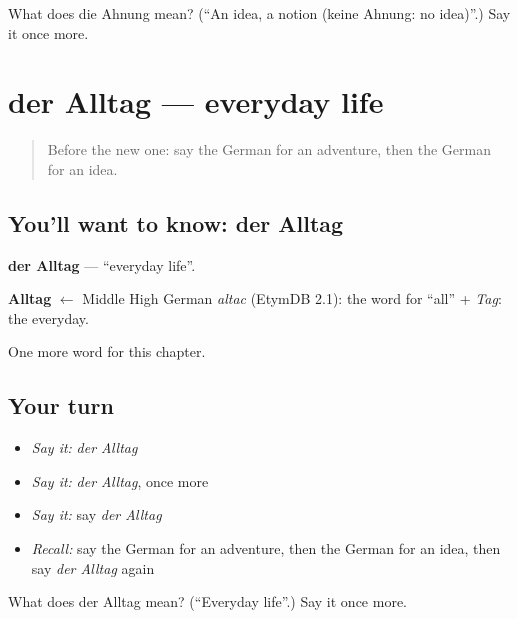 \begin{tcolorbox}[breakable,colback=teal!4,colframe=teal!35!black,title={Before you move on}]
What does die Ahnung mean? (\textquotedblleft{}An idea, a notion (keine Ahnung: no idea)\textquotedblright{}.) Say it once more.
\end{tcolorbox}
\section[der Alltag]{der Alltag — everyday life}

\label{lesson:GE-C225-alltag}



\begin{quote}
Before the new one: say the German for an adventure, then the German for an idea.
\end{quote}

\subsection*{You'll want to know: der Alltag}
\textbf{der Alltag} — \textquotedblleft{}everyday life\textquotedblright{}.

\begin{cousinweb}
\textbf{Alltag} $\leftarrow$ Middle High German \emph{altac} (EtymDB 2.1): the word for \textquotedblleft{}all\textquotedblright{} + \emph{Tag}: the everyday.
\end{cousinweb}

\begin{grammarlens}[title={What you've built}]
One more word for this chapter.
\end{grammarlens}

\subsection*{Your turn}
\begin{itemize}
\raggedright
  \item \emph{Say it:} \emph{der Alltag}
  \item \emph{Say it:} \emph{der Alltag}, once more
  \item \emph{Say it:} say \emph{der Alltag}
  \item \emph{Recall:} say the German for an adventure, then the German for an idea, then say \emph{der Alltag} again
\end{itemize}

\begin{tcolorbox}[breakable,colback=teal!4,colframe=teal!35!black,title={Before you move on}]
What does der Alltag mean? (\textquotedblleft{}Everyday life\textquotedblright{}.) Say it once more.
\end{tcolorbox}
